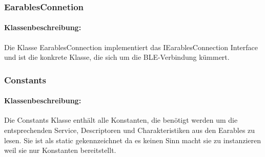 \documentclass[a4paper,12pt]{article}
\begin{document}
\subsubsection{EarablesConnetion}

\paragraph{Klassenbeschreibung:}
Die Klasse EarablesConnection implementiert das IEarablesConnection Interface und ist die konkrete Klasse, die sich um die BLE-Verbindung kümmert.


\subsubsection{Constants}
\paragraph{Klassenbeschreibung:}
Die Constants Klasse enthält alle Konstanten, die benötigt werden um die entsprechenden Service, Descriptoren und Charakteristiken aus den Earables zu lesen. Sie ist als static gekennzeichnet da es keinen Sinn macht sie zu instanzieren weil sie nur Konstanten bereitstellt.
\end{document}
